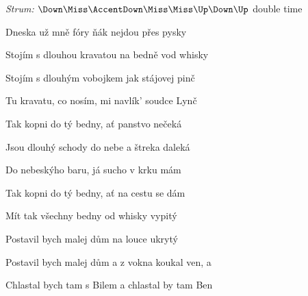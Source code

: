 \begin{song}


\begin{headerbox}
\RaiseBoxWithAccents
{} \quad
\textit{Strum:} $\Down\Miss\AccentDown\Miss\Miss\Up\Down\Up$ double time \quad
\end{headerbox}

\begin{hchordbox}
\end{hchordbox}

\Large

\bigskip

Dneska už mně fóry ňák nejdou přes pysky \par
{}Stojím s dlouhou kravatou na bedně vod whisky \par
{}Stojím s dlouhým vobojkem jak stájovej pinč \par
Tu kravatu, co nosím, mi navlík' soudce Lynč \par

\bigskip

\begin{chorusboxwide}{\Refren}
Tak kopni do tý bedny, ať panstvo nečeká \par
Jsou dlouhý schody do nebe a štreka daleká \par
Do nebeskýho baru, já sucho v krku mám \par
Tak kopni do tý bedny, ať na cestu se dám \par
{}\par
\end{chorusboxwide}

\bigskip

Mít tak všechny bedny od whisky vypitý \par
{}Postavil bych malej dům na louce ukrytý \par
{}Postavil bych malej dům a z vokna koukal ven, a \par
{}Chlastal bych tam s Bilem a chlastal by tam Ben \par


\end{song}
